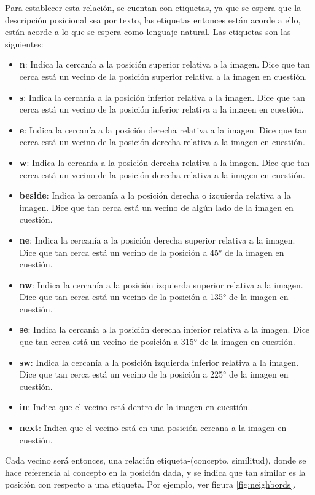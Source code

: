 Para establecer esta relación, se cuentan con etiquetas, ya que se espera que la descripción posicional sea por texto, las etiquetas entonces están acorde a ello, están acorde a lo que se espera como lenguaje natural. Las etiquetas son las siguientes:
\begin{itemize}
    \item \textbf{n}: Indica la cercanía a la posición superior relativa a la imagen. Dice que tan cerca está un vecino de la posición superior relativa a la imagen en cuestión.
    \item \textbf{s}: Indica la cercanía a la posición inferior relativa a la imagen. Dice que tan cerca está un vecino de la posición inferior relativa a la imagen en cuestión.
    \item \textbf{e}: Indica la cercanía a la posición derecha relativa a la imagen. Dice que tan cerca está un vecino de la posición derecha relativa a la imagen en cuestión.
    \item \textbf{w}: Indica la cercanía a la posición derecha relativa a la imagen. Dice que tan cerca está un vecino de la posición derecha relativa a la imagen en cuestión.
    \item \textbf{beside}: Indica la cercanía a la posición derecha o izquierda relativa a la imagen. Dice que tan cerca está un vecino de alg\'un lado de la imagen en cuestión.
    \item \textbf{ne}: Indica la cercanía a la posición derecha superior relativa a la imagen. Dice que tan cerca está un vecino de la posición a 45° de la imagen en cuestión.
    \item \textbf{nw}: Indica la cercanía a la posición izquierda superior relativa a la imagen. Dice que tan cerca está un vecino de la posición a 135° de la imagen en cuestión.
    \item \textbf{se}: Indica la cercanía a la posición derecha inferior relativa a la imagen. Dice que tan cerca está un vecino de posición a 315° de la imagen en cuestión.
    \item \textbf{sw}: Indica la cercanía a la posición izquierda inferior relativa a la imagen. Dice que tan cerca está un vecino de la posición a 225° de la imagen en cuestión.
    \item \textbf{in}: Indica que el vecino está dentro de la imagen en cuestión.
    \item \textbf{next}: Indica que el vecino está en una posición cercana a la imagen en cuestión.
\end{itemize}
Cada vecino será entonces, una relación etiqueta-(concepto, similitud), donde se hace referencia al concepto en la posici\'on dada, y se indica que tan similar es la posición con respecto a una etiqueta. Por ejemplo, ver figura \ref{fig:neighbords}.

